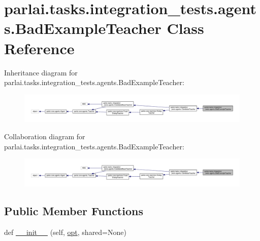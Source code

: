 \hypertarget{classparlai_1_1tasks_1_1integration__tests_1_1agents_1_1BadExampleTeacher}{}\section{parlai.\+tasks.\+integration\+\_\+tests.\+agents.\+Bad\+Example\+Teacher Class Reference}
\label{classparlai_1_1tasks_1_1integration__tests_1_1agents_1_1BadExampleTeacher}


Inheritance diagram for parlai.\+tasks.\+integration\+\_\+tests.\+agents.\+Bad\+Example\+Teacher\+:\nopagebreak
\begin{figure}[H]
\begin{center}
\leavevmode
\includegraphics[width=350pt]{d6/d32/classparlai_1_1tasks_1_1integration__tests_1_1agents_1_1BadExampleTeacher__inherit__graph}
\end{center}
\end{figure}


Collaboration diagram for parlai.\+tasks.\+integration\+\_\+tests.\+agents.\+Bad\+Example\+Teacher\+:\nopagebreak
\begin{figure}[H]
\begin{center}
\leavevmode
\includegraphics[width=350pt]{dd/d6f/classparlai_1_1tasks_1_1integration__tests_1_1agents_1_1BadExampleTeacher__coll__graph}
\end{center}
\end{figure}
\subsection*{Public Member Functions}
\begin{DoxyCompactItemize}
\item 
def \hyperlink{classparlai_1_1tasks_1_1integration__tests_1_1agents_1_1BadExampleTeacher_a977f478a2379e0f40525f3dd5408a87c}{\+\_\+\+\_\+init\+\_\+\+\_\+} (self, \hyperlink{classparlai_1_1tasks_1_1integration__tests_1_1agents_1_1CandidateBaseTeacher_a41dc4440360113264f1389783155e841}{opt}, shared=None)
\end{DoxyCompactItemize}
